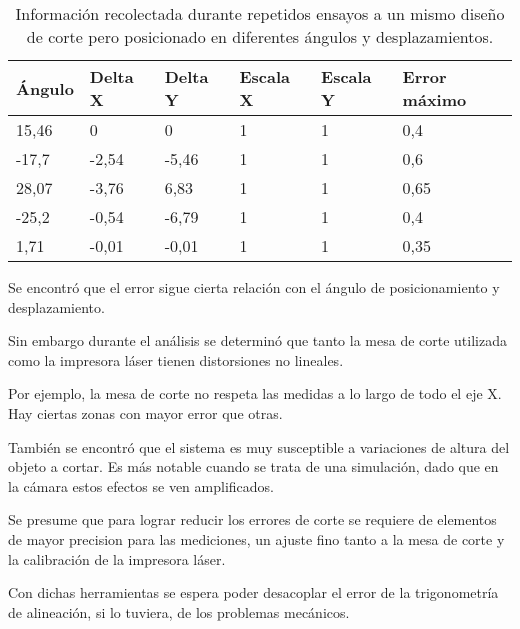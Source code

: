       \begin{table}[!ht]
         \centering
         \caption[Ensayos de corte simulado]{Información recolectada durante repetidos ensayos a un mismo diseño de corte pero posicionado en diferentes ángulos y desplazamientos.}
         \begin{tabular}[!ht]{llllll}
            \toprule
            \textbf{Ángulo} & \textbf{Delta X} & \textbf{Delta Y} & \textbf{Escala X} & \textbf{Escala Y} & \textbf{Error máximo}\\
            \midrule
            15,46 & 0     & 0     & 1 & 1 & 0,4\\
            -17,7 & -2,54 & -5,46 & 1 & 1 & 0,6\\
            28,07 & -3,76 & 6,83  & 1 & 1 & 0,65\\
            -25,2 & -0,54 & -6,79 & 1 & 1 & 0,4\\
            1,71  & -0,01 & -0,01 & 1 & 1 & 0,35\\
            \bottomrule
         \end{tabular}
         \label{tbl:ensayo_A}
      \end{table}

         Se encontró que el error sigue cierta relación con el ángulo de posicionamiento y desplazamiento.\par
      Sin embargo durante el análisis se determinó que tanto la mesa de corte utilizada como la impresora láser tienen distorsiones no lineales.\par
      Por ejemplo, la mesa de corte no respeta las medidas a lo largo de todo el eje X. Hay ciertas zonas con mayor error que otras.\par

      También se encontró que el sistema es muy susceptible a variaciones de altura del objeto a cortar. Es más notable cuando se trata de una simulación, dado que en la cámara estos efectos se ven amplificados.\par

      Se presume que para lograr reducir los errores de corte se requiere de elementos de mayor precision para las mediciones, un ajuste fino tanto a la mesa de corte y la calibración de la impresora láser.\par

   Con dichas herramientas se espera poder desacoplar el error de la trigonometría de alineación, si lo tuviera, de los problemas mecánicos. \par


